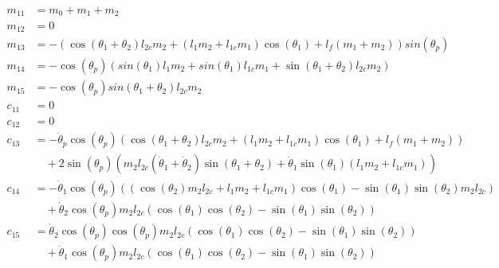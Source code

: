\documentclass{article}
\begin{document}
\begin{equation}
	\begin{aligned}
		m_{11} & = m_0 + m_1 + m_2 \\
		m_{12} & = 0\\
		m_{13} & = -(\cos(\theta_1 + \theta_2) l_{2c} m_2 + (l_1 m_2 + l_{1c} m_1) \cos(\theta_1) + l_f (m_1 + m_2)) sin(\theta_p) \\
		m_{14} & = -\cos(\theta_p) (sin(\theta_1) l_1 m_2 + sin(\theta_1) l_{1c} m_1 + \sin(\theta_1 + \theta_2) l_{2c} m_2)\\
		m_{15} & = -\cos(\theta_p) sin(\theta_1 + \theta_2) l_{2c} m_2\\
		c_{11} & = 0\\
		c_{12} & = 0\\
		c_{13} & = -\dot \theta_p \cos(\theta_p)(\cos(\theta_1 + \theta_2) l_{2c} m_2 + (l_1 m_2 + l_{1c} m_1) \cos(\theta_1) + l_f (m_1 + m_2))  \\
		&\quad + 2 \sin(\theta_p) (m_2 l_{2c} (\dot \theta_1 + \dot \theta_2) \sin(\theta_1 + \theta_2) + \dot \theta_1 \sin(\theta_1) (l_1 m_2 + l_{1c} m_1) )\\
		c_{14} & = - \dot \theta_1 \cos(\theta_p) ((\cos(\theta_2) m_2 l_{2c} + l_1 m_2 + l_{1c} m_1) \cos(\theta_1) - \sin(\theta_1) \sin(\theta_2) m_2 l_{2c})\\
		&\quad + \dot \theta_2 \cos(\theta_p) m_2 l_{2c} (\cos(\theta_1) \cos(\theta_2) - \sin(\theta_1)  \sin(\theta_2))  \\
		c_{15} & = \dot \theta_2 \cos(\theta_p) \cos(\theta_p) m_2 l_{2c} (\cos(\theta_1) \cos(\theta_2) - \sin(\theta_1) \sin(\theta_2))\\
		&\quad  + \dot \theta_1 \cos(\theta_p) m_2 l_{2c} (\cos(\theta_1) \cos(\theta_2) - \sin(\theta_1) \sin(\theta_2)) \\
	\end{aligned}
\end{equation}
\end{document}
